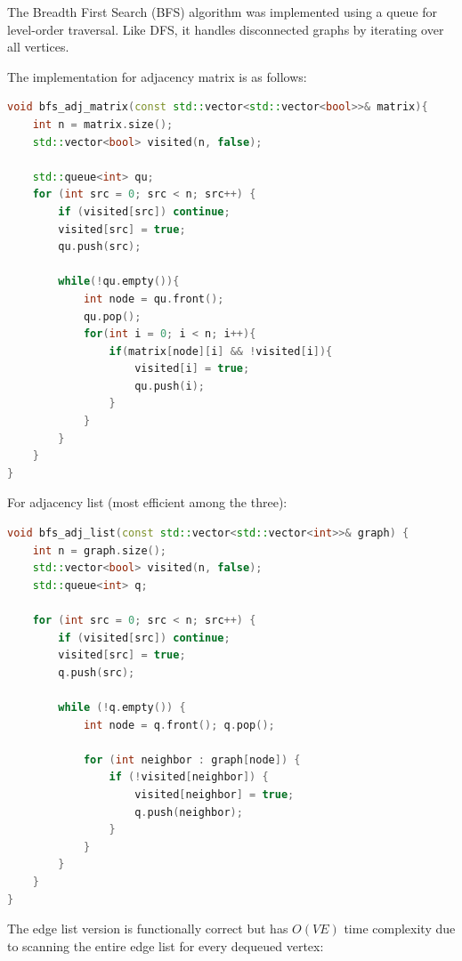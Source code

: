 \documentclass[12pt, a4paper]{report}
\begin{document}
The Breadth First Search (BFS) algorithm was implemented using a queue for level-order traversal. Like DFS, it handles disconnected graphs by iterating over all vertices.

The implementation for adjacency matrix is as follows:

\begin{lstlisting}[language=C++, caption={BFS for adjacency matrix}]
void bfs_adj_matrix(const std::vector<std::vector<bool>>& matrix){
    int n = matrix.size();
    std::vector<bool> visited(n, false);

    std::queue<int> qu;
    for (int src = 0; src < n; src++) {
        if (visited[src]) continue;
        visited[src] = true;
        qu.push(src);

        while(!qu.empty()){
            int node = qu.front();
            qu.pop();
            for(int i = 0; i < n; i++){
                if(matrix[node][i] && !visited[i]){
                    visited[i] = true;
                    qu.push(i);
                } 
            }
        }
    }
}
\end{lstlisting}

\newpage

For adjacency list (most efficient among the three):

\begin{lstlisting}[language=C++, caption={BFS for adjacency list}]
void bfs_adj_list(const std::vector<std::vector<int>>& graph) {
    int n = graph.size();
    std::vector<bool> visited(n, false);
    std::queue<int> q;

    for (int src = 0; src < n; src++) {
        if (visited[src]) continue;
        visited[src] = true;
        q.push(src);

        while (!q.empty()) {
            int node = q.front(); q.pop();

            for (int neighbor : graph[node]) {
                if (!visited[neighbor]) {
                    visited[neighbor] = true;
                    q.push(neighbor);
                }
            }
        }
    }
}
\end{lstlisting}

\newpage

The edge list version is functionally correct but has $O(VE)$ time complexity due to scanning the entire edge list for every dequeued vertex:
\end{document}
